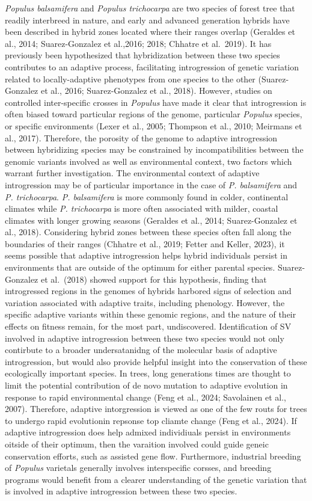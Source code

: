 \documentclass[
]{agujournal2019}
\begin{document}
\emph{Populus balsamifera} and \emph{Populus trichocarpa} are two
species of forest tree that readily interbreed in nature, and early and
advanced generation hybrids have been described in hybrid zones located
where their ranges overlap (Geraldes et al., 2014; Suarez-Gonzalez et
al.,2016; 2018; Chhatre et al.~2019). It has previously been
hypothesized that hybridization between these two species contributes to
an adaptive process, facilitating introgression of genetic variation
related to locally-adaptive phenotypes from one species to the other
(Suarez-Gonzalez et al., 2016; Suarez-Gonzalez et al., 2018). However,
studies on controlled inter-specific crosses in \emph{Populus} have made
it clear that introgression is often biased toward particular regions of
the genome, particular \emph{Populus} species, or specific environments
(Lexer et al., 2005; Thompson et al., 2010; Meirmans et al., 2017).
Therefore, the porosity of the genome to adaptive introgression between
hybridizing species may be constrained by incompatibilities between the
genomic variants involved as well as environmental context, two factors
which warrant further investigation. The environmental context of
adaptive introgression may be of particular importance in the case of
\emph{P. balsamifera} and \emph{P. trichocarpa}. \emph{P. balsamifera}
is more commonly found in colder, continental climates while \emph{P.
trichocarpa} is more often associated with milder, coastal climates with
longer growing seasons (Geraldes et al., 2014; Suarez-Gonzalez et al.,
2018). Considering hybrid zones between these species often fall along
the boundaries of their ranges (Chhatre et al., 2019; Fetter and Keller,
2023), it seems possible that adaptive introgression helps hybrid
individuals persist in environments that are outside of the optimum for
either parental species. Suarez-Gonzalez et al.~(2018) showed support
for this hypothesis, finding that introgressed regions in the genomes of
hybrids harbored signs of selection and variation associated with
adaptive traits, including phenology. However, the specific adaptive
variants within these genomic regions, and the nature of their effects
on fitness remain, for the most part, undiscovered. Identification of SV
involved in adaptive introgression between these two species would not
only contirbute to a broader undersatanidng of the molecular basis of
adaptive introgression, but would also provide helpful insight into the
conservation of these ecologically important species. In trees, long
generations times are thought to limit the potential contribution of de
novo mutation to adaptive evolution in response to rapid environmental
change (Feng et al., 2024; Savolainen et al., 2007). Therefore, adaptive
intorgression is viewed as one of the few routs for trees to undergo
rapid evolutionin repsonse top cliamte change (Feng et al., 2024). If
adaptive introgression does help admixed individiuals persist in
environments oitside of their optimum, then the varaition involved could
guide geneic conservation efforts, such as assisted gene flow.
Furthermore, industrial breeding of \emph{Populus} varietals generally
involves interspecific corsses, and breeding programs would benefit from
a clearer understanding of the genetic variation that is involved in
adaptive introgression between these two species.
\end{document}
